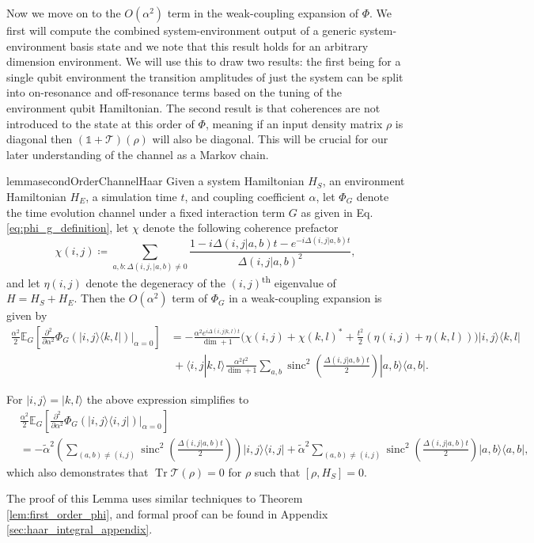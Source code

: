 \documentclass[
 amsmath,amssymb,
 aps,
onecolumn, 
nofootinbib]{revtex4-2}
\newcommand{\ket}[1]{|#1\rangle}
\newcommand{\braket}[2]{\langle #1|#2\rangle}
\newcommand{\ketbra}[2]{| #1\rangle\! \langle #2|}
\newcommand{\ts}{\textsuperscript}
\DeclareMathOperator{\Tr}{Tr}
\newcommand{\identity}{\mathds{1}}
\DeclareMathOperator{\sinc}{sinc}
\begin{document}
Now we move on to the $O(\alpha^2)$ term in the weak-coupling expansion of $\Phi$. We first will compute the combined system-environment output of a generic system-environment basis state and we note that this result holds for an arbitrary dimension environment. We will use this to draw two results:  the first being for a single qubit environment the transition amplitudes of just the system can be split into on-resonance and off-resonance terms based on the tuning of the environment qubit Hamiltonian. The second result is that coherences are not introduced to the state at this order of $\Phi$, meaning if an input density matrix $\rho$ is diagonal then $(\identity + \mathcal{T})(\rho)$ will also be diagonal. This will be crucial for our later understanding of the channel as a Markov chain.
\begin{restatable}{lemma}{secondOrderChannelHaar} \label{lem:big_one}
    Given a system Hamiltonian $H_{S}$, an environment Hamiltonian $H_{E}$, a simulation time $t$, and coupling coefficient $\alpha$, let $\Phi_G$ denote the time evolution channel under a fixed interaction term $G$ as given in Eq. \eqref{eq:phi_g_definition}, let $\chi$ denote the following coherence prefactor
$$ \chi(i,j) \coloneqq \sum_{a,b: \Delta(i,j,|a,b) \neq 0} \frac{1 - i \Delta(i,j|a,b)t - e^{-i \Delta(i,j|a,b) t}}{\Delta(i,j|a,b)^2}, $$
and let $\eta(i,j)$ denote the degeneracy of the $(i,j)$\ts{th} eigenvalue of $H = H_S + H_E$. Then the $O(\alpha^2)$ term of $\Phi_G$ in a weak-coupling expansion is given by
 \begin{align}
 \frac{\alpha^2}{2} \mathbb{E}_G \left[ \frac{\partial^2}{\partial \alpha^2} \Phi_G(\ketbra{i,j}{k,l}) \big|_{\alpha = 0} \right] &= -\frac{\alpha^2  e^{i \Delta(i,j|k,l) t}}{\dim + 1} \bigg(\chi(i,j) + \chi(k,l)^*  + \frac{t^2}{2}(\eta(i,j) + \eta(k,l)) \bigg) \ketbra{i,j}{k,l} \nonumber \\
    &~ + \braket{i,j}{k,l}  \frac{\alpha^2 t^2}{\dim+1} \sum_{a,b} \sinc^2 \left( \frac{\Delta(i,j|a,b)t}{2} \right) \ketbra{a,b}{a,b}.  \label{eq:el_gigante}
 \end{align}

 For $\ket{i, j} = \ket{k, l}$ the above expression simplifies to
 \begin{align}
     &\frac{\alpha^2}{2} \mathbb{E}_G \left[ \frac{\partial^2}{\partial \alpha^2} \Phi_G(\ketbra{i,j}{i,j}) \big|_{\alpha = 0} \right] \nonumber \\
     &=  - \widetilde{\alpha}^2 \left(\sum_{(a,b) \neq (i,j)} \sinc^2 \left(\frac{\Delta(i,j | a,b)t}{2} \right) \right) \ketbra{i, j}{i,j} + \widetilde{\alpha}^2 \sum_{(a,b) \neq (i,j)} \sinc^2 \left(\frac{\Delta(i,j | a,b)t}{2} \right) \ketbra{a, b}{a,b} ,\label{eq:el_gigante_dos}
 \end{align}
 which also demonstrates that $\Tr \mathcal{T}(\rho) = 0$ for $\rho$ such that $[\rho, H_S] = 0$.
\end{restatable}
\noindent The proof of this Lemma uses similar techniques to Theorem \ref{lem:first_order_phi}, and formal proof can be found in Appendix \ref{sec:haar_integral_appendix}.
\end{document}
